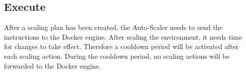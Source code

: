 \subsection{Execute}
After a scaling plan has been created, the Auto-Scaler needs to send the instructions to the Docker engine.
After scaling the environment, it needs time for changes to take effect. Therefore a cooldown period will be activated after each scaling action.
During the cooldown period, no scaling actions will be forwarded to the Docker engine.
